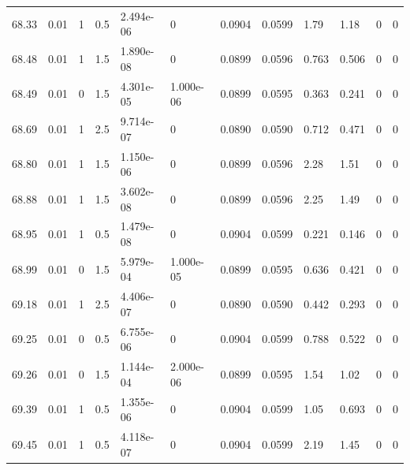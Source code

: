 \documentclass[preview]{standalone}
\begin{document}
{{{{{{{{{{{{{\begin{tabular}{L{1.2cm}C{1.2cm} C{0.3cm}C{0.5cm} C{1.4cm}C{1.4cm} C{1.4cm}C{1.4cm} C{1.6cm}C{1.6cm} C{1.6cm}C{1.6cm}}
  68.33  &  0.01  & 1     & 0.5 &  2.494e-06  & 0  &  0.0904&   0.0599& 1.79 & 1.18   &  0 & 0  \\ 
  68.48  &  0.01  & 1     & 1.5 &  1.890e-08  & 0  &  0.0899&   0.0596& 0.763 & 0.506   &  0 & 0  \\ 
  68.49  &  0.01  & 0     & 1.5 &  4.301e-05  & 1.000e-06  &  0.0899&   0.0595& 0.363 & 0.241   &  0 & 0  \\ 
  68.69  &  0.01  & 1     & 2.5 &  9.714e-07  & 0  &  0.0890&   0.0590& 0.712 & 0.471   &  0 & 0  \\ 
  68.80  &  0.01  & 1     & 1.5 &  1.150e-06  & 0  &  0.0899&   0.0596& 2.28 & 1.51   &  0 & 0  \\ 
  68.88  &  0.01  & 1     & 1.5 &  3.602e-08  & 0  &  0.0899&   0.0596& 2.25 & 1.49   &  0 & 0  \\ 
  68.95  &  0.01  & 1     & 0.5 &  1.479e-08  & 0  &  0.0904&   0.0599& 0.221 & 0.146   &  0 & 0  \\ 
  68.99  &  0.01  & 0     & 1.5 &  5.979e-04  & 1.000e-05  &  0.0899&   0.0595& 0.636 & 0.421   &  0 & 0  \\ 
  69.18  &  0.01  & 1     & 2.5 &  4.406e-07  & 0  &  0.0890&   0.0590& 0.442 & 0.293   &  0 & 0  \\ 
  69.25  &  0.01  & 0     & 0.5 &  6.755e-06  & 0  &  0.0904&   0.0599& 0.788 & 0.522   &  0 & 0  \\ 
  69.26  &  0.01  & 0     & 1.5 &  1.144e-04  & 2.000e-06  &  0.0899&   0.0595& 1.54 & 1.02   &  0 & 0  \\ 
  69.39  &  0.01  & 1     & 0.5 &  1.355e-06  & 0  &  0.0904&   0.0599& 1.05 & 0.693   &  0 & 0  \\ 
  69.45  &  0.01  & 1     & 0.5 &  4.118e-07  & 0  &  0.0904&   0.0599& 2.19 & 1.45   &  0 & 0  \\ 
\hline 
\end{tabular} 

}}}}}}}}}}}}}
\end{document}
